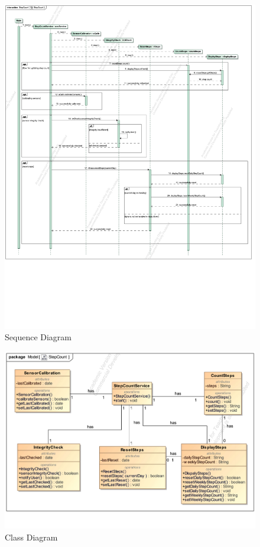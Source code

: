 \documentclass{article}
\begin{document}
		\begin{figure}[h!]
			\centering
			\captionsetup{labelformat=empty}
			\caption{Sequence Diagram}
		    	\includegraphics[width=\textwidth, angle=0]{Marc/step/StepCountSequence.pdf}
		\end{figure}
		\clearpage
		\begin{figure}[h!]
			\centering
			\captionsetup{labelformat=empty}
			\caption{Class Diagram}
		    	\includegraphics[width=\textwidth, angle=0]{Marc/step/StepCountClass.pdf}
		\end{figure}
		\clearpage
\end{document}

